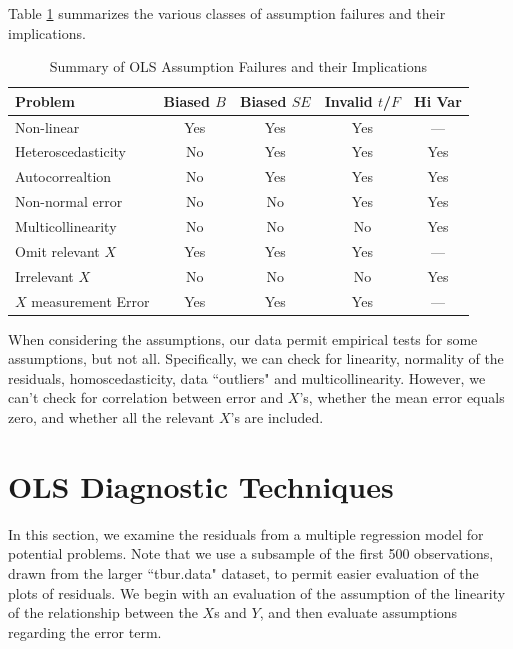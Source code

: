 \documentclass[11pt,openany]{book}\usepackage[]{graphicx}\usepackage[]{color}
\begin{document}
Table \ref{tab:ass} summarizes the various classes of assumption failures and their implications. 

\begin{center}
\begin{table}[h]
\caption{Summary of OLS Assumption Failures and their Implications}
\label{tab:ass}
\begin{tabular}{lcccc}
\hline
Problem               & Biased $B$ & Biased $SE$ & Invalid $t$/$F$ & Hi Var \\
\hline
Non-linear            & Yes        & Yes         & Yes             & ---    \\
Heteroscedasticity    & No         & Yes         & Yes             & Yes    \\
Autocorrealtion       & No         & Yes         & Yes             & Yes    \\
Non-normal error      & No         & No          & Yes             & Yes    \\
Multicollinearity     & No         & No          & No              & Yes    \\
Omit relevant $X$     & Yes        & Yes         & Yes             & ---    \\
Irrelevant $X$        & No         & No          & No              & Yes    \\
$X$ measurement Error & Yes        & Yes         & Yes             & ---   \\
\hline
\end{tabular}
\end{table}
\end{center}

When considering the assumptions, our data permit empirical tests for some assumptions, but not all. Specifically, we can check for linearity, normality of the residuals, homoscedasticity, data ``outliers" and multicollinearity. However, we can't check for correlation between error and $X$'s, whether the mean error equals zero, and whether all the relevant $X$'s  are included. 

\section{OLS Diagnostic Techniques}

In this section, we examine the residuals from a multiple regression model for potential problems. Note that we use a subsample of the first 500 observations, drawn from the larger ``tbur.data" dataset, to permit easier evaluation of the plots of residuals. We begin with an evaluation of the assumption of the linearity of the relationship between the $X$s and $Y$, and then evaluate assumptions regarding the error term. 
\end{document}
